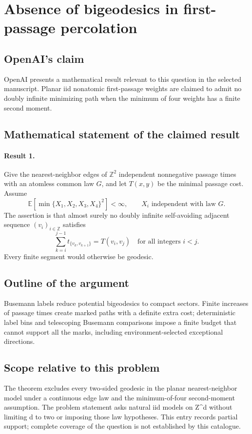 \documentclass[11pt]{article}
\begin{document}
\section*{Absence of bigeodesics in first-passage percolation}

\subsection{OpenAI's claim}
OpenAI presents a mathematical result relevant to this question in the selected manuscript. Planar iid nonatomic first-passage weights are claimed to admit no doubly infinite minimizing path when the minimum of four weights has a finite second moment.

\subsection{Mathematical statement of the claimed result}
\paragraph{Result 1.} Give the nearest-neighbor edges of \(\mathbb Z^2\) independent nonnegative passage times with an atomless common law \(G\), and let \(T(x,y)\) be the minimal passage cost. Assume
\[
 \mathbb E[\min\{X_1,X_2,X_3,X_4\}^2]<\infty,
 \qquad X_i\text{ independent with law }G.
\]
The assertion is that almost surely no doubly infinite self-avoiding adjacent sequence \((v_i)_{i\in\mathbb Z}\) satisfies
\[
 \sum_{k=i}^{j-1}t_{\{v_k,v_{k+1}\}}=T(v_i,v_j)
 \quad\text{for all integers }i<j.
\]
Every finite segment would otherwise be geodesic.

\subsection{Outline of the argument}
Busemann labels reduce potential bigeodesics to compact sectors. Finite increases of passage times create marked paths with a definite extra cost; deterministic label bins and telescoping Busemann comparisons impose a finite budget that cannot support all the marks, including environment-selected exceptional directions.

\subsection{Scope relative to this problem}
The theorem excludes every two-sided geodesic in the planar nearest-neighbor model under a continuous edge law and the minimum-of-four second-moment assumption. The problem statement asks natural iid models on Z\textasciicircum{}d without limiting d to two or imposing those law hypotheses. This entry records partial support; complete coverage of the question is not established by this catalogue.
\end{document}
